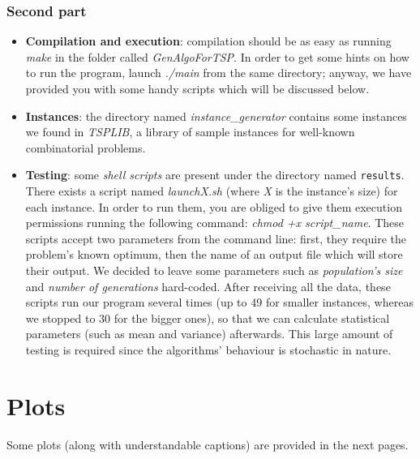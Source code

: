\documentclass[letterpaper, 10 pt, conference]{ieeeconf}  %
\begin{document}
\subsubsection{Second part}
\renewcommand{\labelitemi}{$\star$}
\begin{itemize} 
\item \textbf{Compilation and execution}: compilation should be as easy as running \textit{make} in the folder called \textit{GenAlgoForTSP}.\newline 
In order to get some hints on how to run the program, launch \textit{./main} from the same directory; anyway, we have provided you with some handy scripts which will be discussed below.
\item \textbf{Instances}: the directory named \textit{instance\_generator} contains some instances we found in \textit{TSPLIB}, a library of sample instances for well-known combinatorial problems.
\item \textbf{Testing}: some \textit{shell scripts} are present under the directory named \texttt{results}. There exists a script named \textit{launchX.sh} (where \textit{X} is the instance's size) for each instance. In order to run them, you are obliged to give them execution permissions running the following command: \textit{chmod +x script\_name}. \newline
These scripts accept two parameters from the command line: first, they require the problem's known optimum, then the name of an output file which will store their output. \newline We decided to leave some parameters such as \textit{population's size} and \textit{number of generations} hard-coded. \newline
After receiving all the data, these scripts run our program  several times (up to 49 for smaller instances, whereas we stopped to 30 for the bigger ones), so that we can calculate statistical parameters (such as mean and variance) afterwards.
This large amount of testing is required since the algorithms' behaviour is stochastic in nature.
\end{itemize}

\section*{Plots}
Some plots (along with understandable captions) are provided in the next pages.
\clearpage
\end{document}
